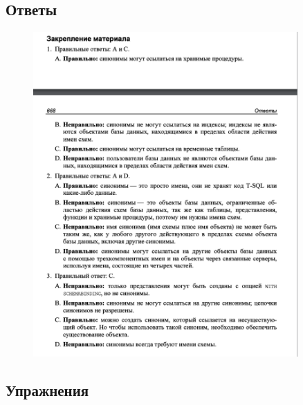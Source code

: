 \subsection*{Ответы}

\begin{figure}[h!]
	\begin{center}
		\includegraphics[width=0.9\textwidth]{img/ans20.png}
	\end{center}
	\captionsetup{justification=centering}
\end{figure}


\newpage
\subsection*{Упражнения}


